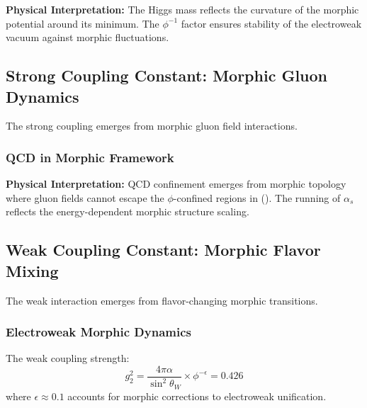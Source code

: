 \textbf{Physical Interpretation:}
The Higgs mass reflects the curvature of the morphic potential around its minimum. The $\phi^{-1}$ factor ensures stability of the electroweak vacuum against morphic fluctuations.

\subsection{Strong Coupling Constant: Morphic Gluon Dynamics}

The strong coupling emerges from morphic gluon field interactions.

\subsubsection{QCD in Morphic Framework}


\textbf{Physical Interpretation:}
QCD confinement emerges from morphic topology where gluon fields cannot escape the $\phi$-confined regions in (). The running of $\alpha_s$ reflects the energy-dependent morphic structure scaling.

\subsection{Weak Coupling Constant: Morphic Flavor Mixing}

The weak interaction emerges from flavor-changing morphic transitions.

\subsubsection{Electroweak Morphic Dynamics}

\begin{theorem}
The weak coupling strength:
\begin{equation}
g_2^2 = \frac{4\pi \alpha}{\sin^2 \theta_W} \times \phi^{-\epsilon} = 0.426
\end{equation}
where $\epsilon \approx 0.1$ accounts for morphic corrections to electroweak unification.
\end{theorem}


